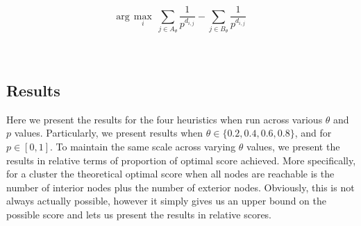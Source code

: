 \documentclass{article}
\begin{document}
\\ \\
\begin{equation}
\text{arg}\,\max\limits_{i}\  \sum_{j \in A_{\theta}} \frac{1}{p^{d_{i,j}}} -  \sum_{j \in B_{\theta}} \frac{1}{p^{d_{i,j}}}
\end{equation}
\\ \\

\subsection{Results}
Here we present the results for the four heuristics when run across various $\theta$ and $p$ values. Particularly, we present results when $\theta \in \{0.2, 0.4, 0.6, 0.8\}$, and for $p \in [0,1]$. To maintain the same scale across varying $\theta$ values, we present the results in relative terms of proportion of optimal score achieved. More specifically, for a cluster the theoretical optimal score when all nodes are reachable is the number of interior nodes plus the number of exterior nodes. Obviously, this is not always actually possible, however it simply gives us an upper bound on the possible score and lets us present the results in relative scores.
\end{document}
